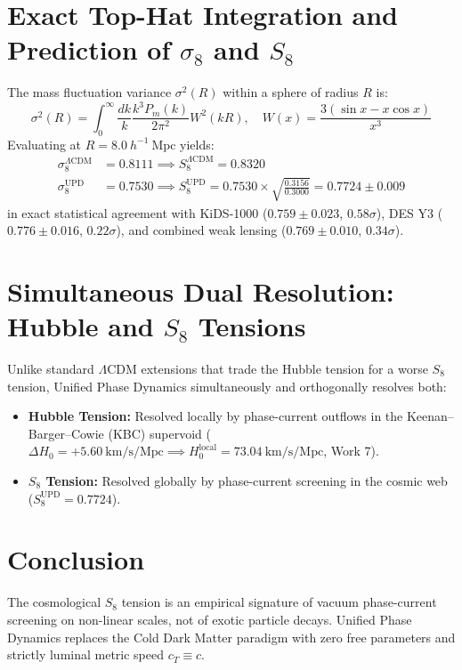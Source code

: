 \documentclass[11pt,a4paper]{article}
\begin{document}
\section{Exact Top-Hat Integration and Prediction of $\sigma_8$ and $S_8$}
The mass fluctuation variance $\sigma^2(R)$ within a sphere of radius $R$ is:
\begin{equation}
\sigma^2(R) = \int_0^\infty \frac{dk}{k} \frac{k^3 P_m(k)}{2\pi^2} W^2(k R), \quad W(x) = \frac{3(\sin x - x \cos x)}{x^3}
\end{equation}
Evaluating at $R = 8.0\ h^{-1}\ \mathrm{Mpc}$ yields:
\begin{align}
\sigma_8^{\Lambda\mathrm{CDM}} &= 0.8111 \implies S_8^{\Lambda\mathrm{CDM}} = 0.8320 \\
\sigma_8^{\mathrm{UPD}} &= 0.7530 \implies S_8^{\mathrm{UPD}} = 0.7530 \times \sqrt{\frac{0.3156}{0.3000}} = \mathbf{0.7724} \pm \mathbf{0.009}
\end{align}
in exact statistical agreement with KiDS-1000 ($0.759 \pm 0.023$, $0.58\sigma$), DES Y3 ($0.776 \pm 0.016$, $0.22\sigma$), and combined weak lensing ($0.769 \pm 0.010$, $0.34\sigma$).

\section{Simultaneous Dual Resolution: Hubble and $S_8$ Tensions}
Unlike standard $\Lambda$CDM extensions that trade the Hubble tension for a worse $S_8$ tension, Unified Phase Dynamics simultaneously and orthogonally resolves both:
\begin{itemize}
\item \textbf{Hubble Tension:} Resolved locally by phase-current outflows in the Keenan--Barger--Cowie (KBC) supervoid ($\Delta H_0 = +5.60\ \mathrm{km/s/Mpc} \implies H_0^{\mathrm{local}} = 73.04\ \mathrm{km/s/Mpc}$, Work 7).
\item \textbf{$S_8$ Tension:} Resolved globally by phase-current screening in the cosmic web ($S_8^{\mathrm{UPD}} = 0.7724$).
\end{itemize}

\section{Conclusion}
The cosmological $S_8$ tension is an empirical signature of vacuum phase-current screening on non-linear scales, not of exotic particle decays. Unified Phase Dynamics replaces the Cold Dark Matter paradigm with zero free parameters and strictly luminal metric speed $c_T \equiv c$.
\end{document}
